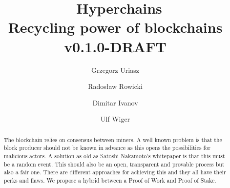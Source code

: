 \documentclass{article}
\title{\huge \Aet\ Hyperchains \\[0.5em]
  \large Recycling power of blockchains
  \\[1em] v0.1.0-DRAFT }
\author{ Grzegorz Uriasz
  \and Radosław Rowicki
  \and Dimitar Ivanov
  \and Ulf Wiger
}
\begin{document}
\maketitle


%
\begin{abstract}

The blockchain relies on consensus between miners. A well known problem is that the block producer should not be known in advance as this opens the possibilities for malicious actors. A solution as old as Satoshi Nakamoto’s whitepaper is that this must be a random event. This should also be an open, transparent and provable process but also a fair one. There are different approaches for achieving this and they all have their perks and flaws. We propose a hybrid between a Proof of Work and Proof of Stake.

\end{abstract}


\tableofcontents

\newpage








 
\end{document}
